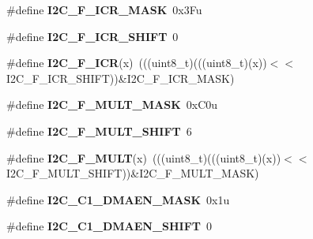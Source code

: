 \begin{DoxyCompactItemize}
\item 
\#define {\bfseries I2\+C\+\_\+\+F\+\_\+\+I\+C\+R\+\_\+\+M\+A\+SK}~0x3\+Fu\hypertarget{group__I2C__Register__Masks_gaeb777a93b5695409902fb2f2b77eb760}{}\label{group__I2C__Register__Masks_gaeb777a93b5695409902fb2f2b77eb760}

\item 
\#define {\bfseries I2\+C\+\_\+\+F\+\_\+\+I\+C\+R\+\_\+\+S\+H\+I\+FT}~0\hypertarget{group__I2C__Register__Masks_ga8e2daf0de75e77e33467f6b132be0c30}{}\label{group__I2C__Register__Masks_ga8e2daf0de75e77e33467f6b132be0c30}

\item 
\#define {\bfseries I2\+C\+\_\+\+F\+\_\+\+I\+CR}(x)~(((uint8\+\_\+t)(((uint8\+\_\+t)(x))$<$$<$I2\+C\+\_\+\+F\+\_\+\+I\+C\+R\+\_\+\+S\+H\+I\+FT))\&I2\+C\+\_\+\+F\+\_\+\+I\+C\+R\+\_\+\+M\+A\+SK)\hypertarget{group__I2C__Register__Masks_ga18089fd1cbe1936b133d50d580d39e6d}{}\label{group__I2C__Register__Masks_ga18089fd1cbe1936b133d50d580d39e6d}

\item 
\#define {\bfseries I2\+C\+\_\+\+F\+\_\+\+M\+U\+L\+T\+\_\+\+M\+A\+SK}~0x\+C0u\hypertarget{group__I2C__Register__Masks_ga9e077caa9ac07c03f5e34e431d0806fa}{}\label{group__I2C__Register__Masks_ga9e077caa9ac07c03f5e34e431d0806fa}

\item 
\#define {\bfseries I2\+C\+\_\+\+F\+\_\+\+M\+U\+L\+T\+\_\+\+S\+H\+I\+FT}~6\hypertarget{group__I2C__Register__Masks_ga3a338cb3af4c140fde82427d091d5b4a}{}\label{group__I2C__Register__Masks_ga3a338cb3af4c140fde82427d091d5b4a}

\item 
\#define {\bfseries I2\+C\+\_\+\+F\+\_\+\+M\+U\+LT}(x)~(((uint8\+\_\+t)(((uint8\+\_\+t)(x))$<$$<$I2\+C\+\_\+\+F\+\_\+\+M\+U\+L\+T\+\_\+\+S\+H\+I\+FT))\&I2\+C\+\_\+\+F\+\_\+\+M\+U\+L\+T\+\_\+\+M\+A\+SK)\hypertarget{group__I2C__Register__Masks_ga8f7d596736ebbdc72c823abdc045adfd}{}\label{group__I2C__Register__Masks_ga8f7d596736ebbdc72c823abdc045adfd}

\item 
\#define {\bfseries I2\+C\+\_\+\+C1\+\_\+\+D\+M\+A\+E\+N\+\_\+\+M\+A\+SK}~0x1u\hypertarget{group__I2C__Register__Masks_gadfd8fccdd35a4944a1e53ffa26e5d06b}{}\label{group__I2C__Register__Masks_gadfd8fccdd35a4944a1e53ffa26e5d06b}

\item 
\#define {\bfseries I2\+C\+\_\+\+C1\+\_\+\+D\+M\+A\+E\+N\+\_\+\+S\+H\+I\+FT}~0\hypertarget{group__I2C__Register__Masks_ga1cd5f87cc18a56d293697f0463e2a9e3}{}\label{group__I2C__Register__Masks_ga1cd5f87cc18a56d293697f0463e2a9e3}


\end{DoxyCompactItemize}
